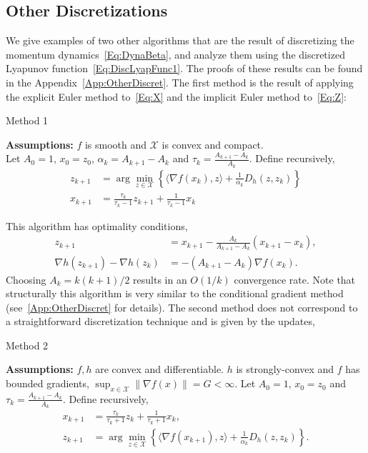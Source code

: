 \documentclass[11pt]{article}
\theoremstyle{plain}
\newcommand{\X}{{\mathcal X}}
\begin{document}
\subsection{Other Discretizations}
We give examples of two other algorithms that are the result of discretizing the momentum dynamics~\eqref{Eq:DynaBeta}, and analyze them using the discretized Lyapunov function~\eqref{Eq:DiscLyapFunc1}. The proofs of these results can be found in the Appendix~\ref{App:OtherDiscret}. The first method is the result of applying the explicit Euler method to~\eqref{Eq:X} and the implicit Euler method to~\eqref{Eq:Z}:
\begin{algorithm}[H]
\caption{Method 1}
{\bf Assumptions:} $f$ is smooth and $\X$ is convex and compact. \\
Let $A_0 = 1$, $x_0 = z_0$, $\alpha_k = A_{k+1} - A_k$ and $\tau_k = \frac{A_{k+1}- A_k}{A_{k}}$. Define recursively,
\begin{subequations}\label{Eq:QuasiSub2}
\begin{align}
z_{k+1} &= \arg \min_{z \in \X} \left\{\langle \nabla f(x_k),z \rangle + \frac{1}{\alpha_k} D_h(z, z_k)\right\}\\
x_{k+1} &= \frac{\tau_k}{\tau_k - 1}z_{k+1} + \frac{1}{\tau_k - 1}  x_k
\end{align} 
\end{subequations}
\end{algorithm}
\noindent This algorithm has optimality conditions,
\begin{subequations}
\begin{align}
z_{k+1} &= x_{k+1} - \frac{A_{k}}{A_{k+1} -A_{k}} (x_{k+1} - x_k),\label{Eq:ZSeqOther1}\\
\nabla h(z_{k+1}) -\nabla h(z_k) &= -(A_{k+1} - A_{k})\nabla f(x_{k}) \label{Eq:XSeqOther1}.
\end{align}
\end{subequations}
\noindent Choosing $A_k = k(k+1)/2$ results in an $O(1/k)$ convergence rate. Note that structurally this algorithm is very similar to the conditional gradient method (see~\ref{App:OtherDiscret} for details). The second method does not correspond to a straightforward discretization technique and is given by the updates,
\begin{algorithm}[H]
\caption{Method 2}
{\bf Assumptions:} $f, h$ are convex and differentiable. $h$ is strongly-convex and $f$ has bounded gradients, $\sup_{x\in\X}\|\nabla f(x)\| = G <\infty$. 
Let $A_0 = 1$, $x_0 = z_0$ and $\tau_k = \frac{A_{k+1}- A_k}{A_{k}}$. Define recursively,
\begin{subequations}\label{Eq:QuasiSub3}
\begin{align}
x_{k+1}  &= \frac{\tau_k}{\tau_k + 1} z_k + \frac{1}{\tau_k+1}x_k,\\%
z_{k+1} &= \arg \min_{z \in \X} \left\{\langle \nabla f(x_{k+1}),z\rangle + \frac{1}{\alpha_k} D_h(z, z_k)\right\}.
\end{align} 
\end{subequations}
\end{algorithm}
\end{document}
